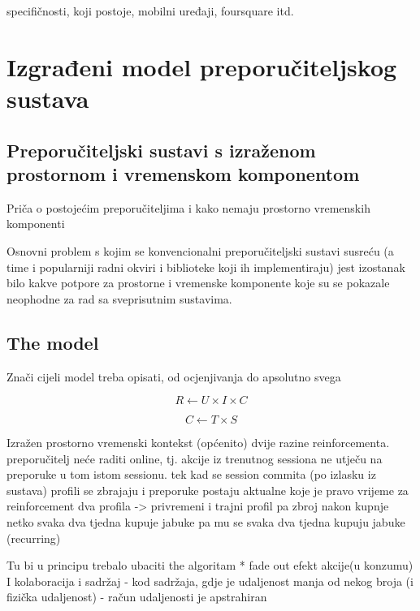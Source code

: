 \documentclass[times, utf8, diplomski, numeric]{fer}
\begin{document}
specifičnosti, koji postoje, mobilni uređaji, foursquare itd.
\chapter{Izgrađeni model preporučiteljskog sustava}


\section{Preporučiteljski sustavi s izraženom prostornom i vremenskom
komponentom}

Priča o postojećim preporučiteljima i kako nemaju prostorno vremenskih
komponenti 

Osnovni problem s kojim se konvencionalni preporučiteljski sustavi susreću (a
time i popularniji radni okviri i biblioteke koji ih implementiraju) jest
izostanak bilo kakve potpore za prostorne i vremenske komponente koje
su se pokazale neophodne za rad sa sveprisutnim sustavima. 

\section{The model}
Znači cijeli model treba opisati, od ocjenjivanja do apsolutno svega

\begin{equation}
\label{eq:DefModel}
	R \leftarrow U \times I \times C
\end{equation}

\begin{equation}
\label{eq:Context}
	C \leftarrow T \times S
\end{equation}

Izražen prostorno vremenski kontekst (općenito)
dvije razine reinforcementa. preporučitelj neće raditi online, tj. akcije iz
trenutnog sessiona ne utječu na preporuke u tom istom sessionu. tek kad se
session commita (po izlasku iz sustava) profili se zbrajaju i preporuke postaju
aktualne koje je pravo vrijeme za reinforcement dva profila -> privremeni i
trajni profil pa zbroj nakon kupnje netko svaka dva tjedna kupuje jabuke pa mu
se svaka dva tjedna kupuju jabuke (recurring)


Tu bi u principu trebalo ubaciti the algoritam
* fade out efekt
akcije(u konzumu)
I kolaboracija i sadržaj
- kod sadržaja, gdje je udaljenost manja od nekog broja (i fizička udaljenost)
- račun udaljenosti je apstrahiran
\end{document}
